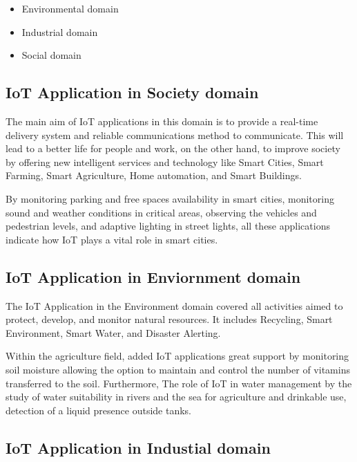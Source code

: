 \documentclass[conference]{IEEEtran}
\begin{document}
\begin{itemize}
	\item Environmental domain
	\item Industrial domain
	\item Social domain
	
\end{itemize}



\subsection{IoT Application in Society domain }

The main aim of IoT applications in this domain is to provide a real-time delivery system and reliable communications method to communicate. This will lead to a better life for people and work, on the other hand, to improve society by offering new intelligent services and technology like  Smart Cities, Smart Farming, Smart Agriculture,  Home automation, and Smart Buildings.

By monitoring parking and free spaces availability in smart cities, monitoring sound and weather conditions in critical areas, observing the vehicles and pedestrian levels, and adaptive lighting in street lights, all these applications indicate how IoT plays a vital role in smart cities. \cite{por}



\subsection{IoT Application in Enviornment domain}

The IoT Application in the Environment domain covered all activities aimed to protect, develop, and monitor natural resources. It includes  Recycling, Smart Environment, Smart Water, and Disaster Alerting. 

Within the agriculture field, added IoT applications great support by monitoring soil moisture allowing the option to maintain and control the number of vitamins transferred to the soil. Furthermore, The role of IoT in water management by the study of water suitability in rivers and the sea for agriculture and drinkable use, detection of a liquid presence outside tanks.\cite{por}

\subsection{IoT Application in Industial domain}
\end{document}
